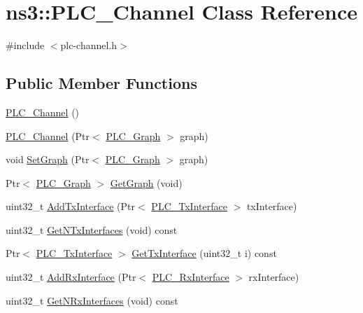 \hypertarget{classns3_1_1PLC__Channel}{\section{ns3\-:\-:\-P\-L\-C\-\_\-\-Channel \-Class \-Reference}
\label{classns3_1_1PLC__Channel}
}


{\ttfamily \#include $<$plc-\/channel.\-h$>$}

\subsection*{\-Public \-Member \-Functions}
\begin{DoxyCompactItemize}
\item 
\hyperlink{classns3_1_1PLC__Channel_a0e9b3acca482aecfea2c9665e6f32ace}{\-P\-L\-C\-\_\-\-Channel} ()
\item 
\hyperlink{classns3_1_1PLC__Channel_acef2a8d6dde042ff14746dd8af7762d1}{\-P\-L\-C\-\_\-\-Channel} (\-Ptr$<$ \hyperlink{classns3_1_1PLC__Graph}{\-P\-L\-C\-\_\-\-Graph} $>$ graph)
\item 
void \hyperlink{classns3_1_1PLC__Channel_af65d9c7bae272538860cea8bb772db36}{\-Set\-Graph} (\-Ptr$<$ \hyperlink{classns3_1_1PLC__Graph}{\-P\-L\-C\-\_\-\-Graph} $>$ graph)
\item 
\-Ptr$<$ \hyperlink{classns3_1_1PLC__Graph}{\-P\-L\-C\-\_\-\-Graph} $>$ \hyperlink{classns3_1_1PLC__Channel_a6b451dc47ab893697df18fc1d2ee5ff8}{\-Get\-Graph} (void)
\item 
uint32\-\_\-t \hyperlink{classns3_1_1PLC__Channel_a73a5536b841a92523150328bd2b85aea}{\-Add\-Tx\-Interface} (\-Ptr$<$ \hyperlink{classns3_1_1PLC__TxInterface}{\-P\-L\-C\-\_\-\-Tx\-Interface} $>$ tx\-Interface)
\item 
uint32\-\_\-t \hyperlink{classns3_1_1PLC__Channel_a372e033f5ce2b93087e737137ff4feff}{\-Get\-N\-Tx\-Interfaces} (void) const 
\item 
\-Ptr$<$ \hyperlink{classns3_1_1PLC__TxInterface}{\-P\-L\-C\-\_\-\-Tx\-Interface} $>$ \hyperlink{classns3_1_1PLC__Channel_a77f1dd8f29f132466f6575806f110973}{\-Get\-Tx\-Interface} (uint32\-\_\-t i) const 
\item 
uint32\-\_\-t \hyperlink{classns3_1_1PLC__Channel_ac0726a9b7366e2ab59808ec7f055bc7d}{\-Add\-Rx\-Interface} (\-Ptr$<$ \hyperlink{classns3_1_1PLC__RxInterface}{\-P\-L\-C\-\_\-\-Rx\-Interface} $>$ rx\-Interface)
\item 
uint32\-\_\-t \hyperlink{classns3_1_1PLC__Channel_a3aa9e800cbe2e94a1f807be9184da5e5}{\-Get\-N\-Rx\-Interfaces} (void) const 

\end{DoxyCompactItemize}
